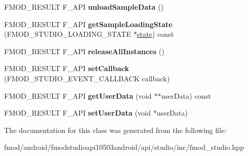 \begin{DoxyCompactItemize}
\item 
\hypertarget{class_f_m_o_d_1_1_studio_1_1_event_description_a8945fad3c534826d75b418957b1746e9}{F\+M\+O\+D\+\_\+\+R\+E\+S\+U\+L\+T F\+\_\+\+A\+P\+I {\bfseries unload\+Sample\+Data} ()}\label{class_f_m_o_d_1_1_studio_1_1_event_description_a8945fad3c534826d75b418957b1746e9}

\item 
\hypertarget{class_f_m_o_d_1_1_studio_1_1_event_description_ae60dd6087211b51b05113f960df14e22}{F\+M\+O\+D\+\_\+\+R\+E\+S\+U\+L\+T F\+\_\+\+A\+P\+I {\bfseries get\+Sample\+Loading\+State} (F\+M\+O\+D\+\_\+\+S\+T\+U\+D\+I\+O\+\_\+\+L\+O\+A\+D\+I\+N\+G\+\_\+\+S\+T\+A\+T\+E $\ast$\hyperlink{structstate}{state}) const }\label{class_f_m_o_d_1_1_studio_1_1_event_description_ae60dd6087211b51b05113f960df14e22}

\item 
\hypertarget{class_f_m_o_d_1_1_studio_1_1_event_description_a23d9947f9a8cd4b49d0d052c2139a35a}{F\+M\+O\+D\+\_\+\+R\+E\+S\+U\+L\+T F\+\_\+\+A\+P\+I {\bfseries release\+All\+Instances} ()}\label{class_f_m_o_d_1_1_studio_1_1_event_description_a23d9947f9a8cd4b49d0d052c2139a35a}

\item 
\hypertarget{class_f_m_o_d_1_1_studio_1_1_event_description_a4ccc1179f548979cb6bb4d8ba4e48200}{F\+M\+O\+D\+\_\+\+R\+E\+S\+U\+L\+T F\+\_\+\+A\+P\+I {\bfseries set\+Callback} (F\+M\+O\+D\+\_\+\+S\+T\+U\+D\+I\+O\+\_\+\+E\+V\+E\+N\+T\+\_\+\+C\+A\+L\+L\+B\+A\+C\+K callback)}\label{class_f_m_o_d_1_1_studio_1_1_event_description_a4ccc1179f548979cb6bb4d8ba4e48200}

\item 
\hypertarget{class_f_m_o_d_1_1_studio_1_1_event_description_a72fd27ce38884afbf398467900c6b4ff}{F\+M\+O\+D\+\_\+\+R\+E\+S\+U\+L\+T F\+\_\+\+A\+P\+I {\bfseries get\+User\+Data} (void $\ast$$\ast$user\+Data) const }\label{class_f_m_o_d_1_1_studio_1_1_event_description_a72fd27ce38884afbf398467900c6b4ff}

\item 
\hypertarget{class_f_m_o_d_1_1_studio_1_1_event_description_ab427c415ba8b984dbd7c5a5db53a9232}{F\+M\+O\+D\+\_\+\+R\+E\+S\+U\+L\+T F\+\_\+\+A\+P\+I {\bfseries set\+User\+Data} (void $\ast$user\+Data)}\label{class_f_m_o_d_1_1_studio_1_1_event_description_ab427c415ba8b984dbd7c5a5db53a9232}

\end{DoxyCompactItemize}


The documentation for this class was generated from the following file\+:\begin{DoxyCompactItemize}
\item 
fmod/android/fmodstudioapi10503android/api/studio/inc/fmod\+\_\+studio.\+hpp\end{DoxyCompactItemize}
